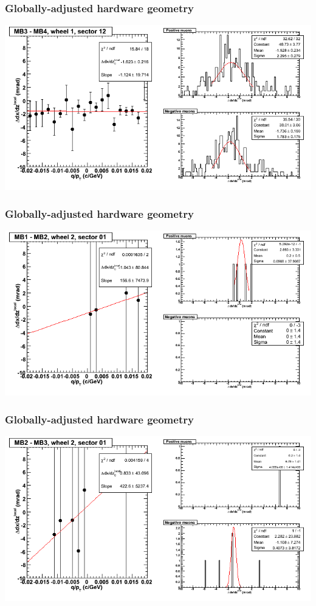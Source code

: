 \documentclass[compress]{beamer}
\begin{document}
\begin{frame}
\frametitle{Globally-adjusted hardware geometry}
\includegraphics[width=\linewidth]{NOV4_segdiffs_HW/dt13_slope_D_12_34.png}
\end{frame}

\begin{frame}
\frametitle{Globally-adjusted hardware geometry}
\includegraphics[width=\linewidth]{NOV4_segdiffs_HW/dt13_slope_E_01_12.png}
\end{frame}

\begin{frame}
\frametitle{Globally-adjusted hardware geometry}
\includegraphics[width=\linewidth]{NOV4_segdiffs_HW/dt13_slope_E_01_23.png}
\end{frame}
\end{document}
